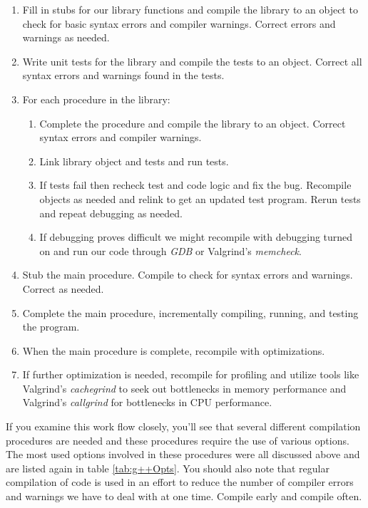 \documentclass[]{tufte-handout}
\begin{document}
\begin{enumerate}
\item Fill in stubs for our library functions and compile the library to an object to check for basic syntax errors and compiler warnings.  Correct errors and warnings as needed.
\item Write unit tests for the library and compile the tests to an object. Correct all syntax errors and warnings found in the tests. 
\item For each procedure in the library:
\begin{enumerate}
\item Complete the procedure and compile the library to an object. Correct syntax errors and compiler warnings.
\item Link library object and tests and run tests.
\item If tests fail then recheck test and code logic and fix the bug. Recompile objects as needed and relink to get an updated test program. Rerun tests and repeat debugging as needed. 
\item If debugging proves difficult we might recompile with debugging turned on and run our code through \textit{GDB} or Valgrind's \textit{memcheck}.
\end{enumerate}
\item Stub the main procedure. Compile to check for syntax errors and warnings. Correct as needed.
\item Complete the main procedure, incrementally compiling, running, and testing the program.
\item When the main procedure is complete, recompile with optimizations. 
\item If further optimization is needed, recompile for profiling and utilize tools like Valgrind's \textit{cachegrind} to seek out bottlenecks in memory performance and Valgrind's \textit{callgrind} for bottlenecks in CPU performance. 
\end{enumerate} 

If you examine this work flow closely, you'll see that several different compilation procedures are needed and these procedures require the use of various options.  The most used options involved in these procedures were all discussed above and are listed again in table \ref{tab:g++Opts}.  You should also note that regular compilation of code is used in an effort to reduce the number of compiler errors and warnings we have to deal with at one time.  Compile early and compile often.  
\end{document}
